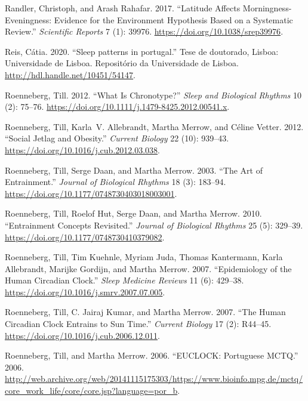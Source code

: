 \documentclass[
  12pt,
  a4paper,
  oneside]{tesesusp}
\newlength{\cslhangindent}
\newlength{\cslentryspacingunit} %
\newenvironment{CSLReferences}[2] %
 {%
  \setlength{\parindent}{0pt}
  \ifodd #1
  \let\oldpar\par
  \def\par{\hangindent=\cslhangindent\oldpar}
  \fi
  \setlength{\parskip}{#2\cslentryspacingunit}
 }%
 {}
\begin{document}
\begin{CSLReferences}{1}{0}
\leavevmode{}%
Randler, Christoph, and Arash Rahafar. 2017. {``Latitude Affects
Morningness-Eveningness: Evidence for the Environment Hypothesis Based
on a Systematic Review.''} \emph{Scientific Reports} 7 (1): 39976.
\url{https://doi.org/10.1038/srep39976}.

\leavevmode{}%
Reis, Cátia. 2020. {``Sleep patterns in portugal.''} Tese de doutorado,
Lisboa: Universidade de Lisboa. Repositório da Universidade de Lisboa.
\url{http://hdl.handle.net/10451/54147}.

\leavevmode{}%
Roenneberg, Till. 2012. {``What Is Chronotype?''} \emph{Sleep and
Biological Rhythms} 10 (2): 75--76.
\url{https://doi.org/10.1111/j.1479-8425.2012.00541.x}.

\leavevmode{}%
Roenneberg, Till, Karla~V. Allebrandt, Martha Merrow, and Céline Vetter.
2012. {``Social Jetlag and Obesity.''} \emph{Current Biology} 22 (10):
939--43. \url{https://doi.org/10.1016/j.cub.2012.03.038}.

\leavevmode{}%
Roenneberg, Till, Serge Daan, and Martha Merrow. 2003. {``The Art of
Entrainment.''} \emph{Journal of Biological Rhythms} 18 (3): 183--94.
\url{https://doi.org/10.1177/0748730403018003001}.

\leavevmode{}%
Roenneberg, Till, Roelof Hut, Serge Daan, and Martha Merrow. 2010.
{``Entrainment Concepts Revisited.''} \emph{Journal of Biological
Rhythms} 25 (5): 329--39.
\url{https://doi.org/10.1177/0748730410379082}.

\leavevmode{}%
Roenneberg, Till, Tim Kuehnle, Myriam Juda, Thomas Kantermann, Karla
Allebrandt, Marijke Gordijn, and Martha Merrow. 2007. {``Epidemiology of
the Human Circadian Clock.''} \emph{Sleep Medicine Reviews} 11 (6):
429--38. \url{https://doi.org/10.1016/j.smrv.2007.07.005}.

\leavevmode{}%
Roenneberg, Till, C. Jairaj Kumar, and Martha Merrow. 2007. {``The Human
Circadian Clock Entrains to Sun Time.''} \emph{Current Biology} 17 (2):
R44--45. \url{https://doi.org/10.1016/j.cub.2006.12.011}.

\leavevmode{}%
Roenneberg, Till, and Martha Merrow. 2006. {``EUCLOCK: Portuguese
MCTQ.''} 2006.
\url{http://web.archive.org/web/20141115175303/https://www.bioinfo.mpg.de/mctq/core_work_life/core/core.jsp?language=por_b}.


\end{CSLReferences}
\end{document}
